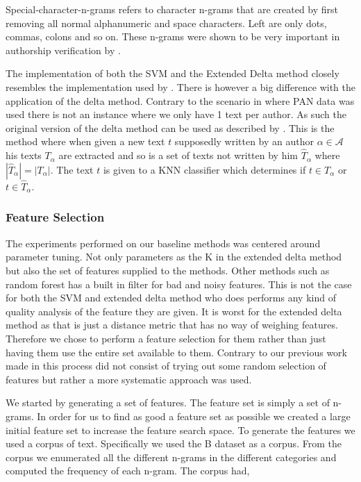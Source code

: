 Special-character-n-grams refers to character n-grams that are created by first
removing all normal alphanumeric and space characters. Left are only dots,
commas, colons and so on. These n-grams were shown to be very important in
authorship verification by \citep{US}.

The implementation of both the \gls{SVM} and the Extended Delta method closely
resembles the implementation used by \citet{US}. There is however a big
difference with the application of the delta method. Contrary to the scenario
in \citet{US} where PAN data was used there is not an instance where we only
have 1 text per author. As such the original version of the delta method can be
used as described by \citet{evert2015towards}. This is the method where when
given a new text $t$ supposedly written by an author $\alpha \in \mathcal{A}$
his texts $T_\alpha$ are extracted and so is a set of texts not written by
him $\hat{T}_\alpha$ where $|\hat{T}_\alpha| = |T_\alpha|$. The text $t$ is
given to a \gls{KNN} classifier which determines if $t \in T_\alpha$ or $t \in
\hat{T}_\alpha$.


\subsubsection{Feature Selection}

The experiments performed on our baseline methods was centered around parameter
tuning. Not only parameters as the K in the extended delta method but also the
set of features supplied to the methods. Other methods such as random forest
has a built in filter for bad and noisy features. This is not the case for both
the \gls{SVM} and extended delta method who does performs any kind of quality
analysis of the feature they are given. It is worst for the extended delta
method as that is just a distance metric that has no way of weighing features.
Therefore we chose to perform a feature selection for them rather than just
having them use the entire set available to them. Contrary to our previous
work made in \citep{US} this process did not consist of trying out some random
selection of features but rather a more systematic approach was used.

We started by generating a set of features. The feature set is simply a set of
n-grams. In order for us to find as good a feature set as possible we created a
large initial feature set to increase the feature search space. To generate the
features we used a corpus of text. Specifically we used the \gls{B} dataset as a
corpus. From the corpus we enumerated all the different n-grams in the different
categories and computed the frequency of each n-gram. The corpus had,

